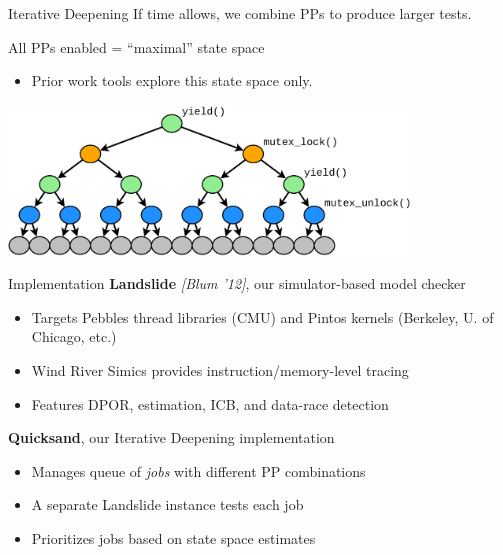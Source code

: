 \documentclass[xcolor=dvipsnames]{beamer}
\begin{document}
\begin{frame}{Iterative Deepening}
	If time allows, we combine PPs to produce larger tests.
	\linegap

	All PPs enabled = ``maximal'' state space
	\begin{itemize}
		\item Prior work tools explore this state space only.
	\end{itemize}
	\linegap

	\begin{center}
		\includegraphics[width=0.8\textwidth]{tree3.pdf}
	\end{center}
\end{frame}

\begin{frame}{Implementation}
	\textbf{Landslide} {\em [Blum '12]}, our simulator-based model checker
	\begin{itemize}
		\item Targets Pebbles thread libraries (CMU) and Pintos kernels (Berkeley, U. of Chicago, etc.)
		\item Wind River Simics provides instruction/memory-level tracing
		\item Features DPOR, estimation, ICB, and data-race detection
	\end{itemize}
	\linegap

	{\bf Quicksand}, our Iterative Deepening implementation
	\begin{itemize}
		\item Manages queue of {\em jobs} with different PP combinations
		\item A separate Landslide instance tests each job
		\item Prioritizes jobs based on state space estimates
	\end{itemize}
\end{frame}
\end{document}
